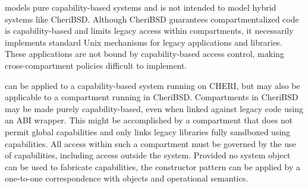 \TMmodelName{} models pure capability-based systems and is not intended to model hybrid systems like CheriBSD.
Although CheriBSD guarantees compartmentalized code is capability-based and limits legacy access within compartments, it necessarily implements standard Unix mechanisms for legacy applications and libraries.
These applications are not bound by capability-based access control, making cross-compartment policies difficult to implement.

\TMmodelName{} can be applied to a capability-based system running on CHERI, but may also be applicable to a compartment running in CheriBSD.
Compartments in CheriBSD may be made purely capability-based, even when linked against legacy code using an ABI wrapper.
This might be accomplished by a compartment that does not permit global capabilities and only links legacy libraries fully sandboxed using capabilities.
All access within such a compartment must be governed by the use of capabilities, including access outside the system.
Provided no system object can be used to fabricate capabilities, the constructor pattern can be applied by a one-to-one correspondence with \TMmodelName{} objects and operational semantics.
